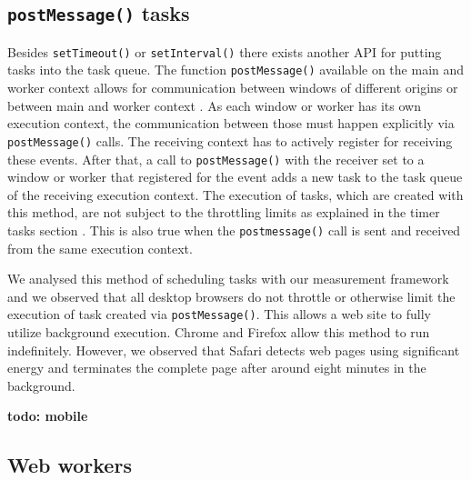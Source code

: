 \documentclass[
	ruledheaders=section,%
	class=report,%
	thesis={type=bachelor},%
	accentcolor=9c,%
	custommargins=true,%
	marginpar=false,%
	parskip=half-,%
	fontsize=11pt,%
]{tudapub}
\begin{document}
  \subsection{\texttt{postMessage()} tasks}

  Besides \texttt{setTimeout()} or \texttt{setInterval()} there exists another API for putting tasks into the task queue. The function \texttt{postMessage()} available on the main and worker context allows for communication between windows of different origins or between main and worker context \cite{mdn-postmessage}. As each window or worker has its own execution context, the communication between those must happen explicitly via \texttt{postMessage()} calls. The receiving context has to actively register for receiving these events. After that, a call to \texttt{postMessage()} with the receiver set to a window or worker that registered for the event adds a new task to the task queue of the receiving execution context. The execution of tasks, which are created with this method, are not subject to the throttling limits as explained in the timer tasks section \cite{zero-delay-timeouts}. This is also true when the \texttt{postmessage()} call is sent and received from the same execution context.

  We analysed this method of scheduling tasks with our measurement framework and we observed that all desktop browsers do not throttle or otherwise limit the execution of task created via \texttt{postMessage()}. This allows a web site to fully utilize background execution. Chrome and Firefox allow this method to run indefinitely. However, we observed that Safari detects web pages using significant energy and terminates the complete page after around eight minutes in the background.

  \textbf{todo: mobile}

  
  \subsection{Web workers}
\end{document}

